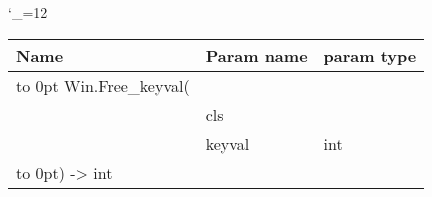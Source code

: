 \begingroup \catcode`\_=12 \tt
\begin{tabular}{lll}
\toprule
\textrm{Name}&\textrm{Param name}&\textrm{param type}\\
\midrule
\hbox to 0pt {Win.Free_keyval(\hss}\\
& cls\\
& keyval & int\\
\hbox to 0pt{) -> int\hss}\\
\bottomrule
\end{tabular}
\endgroup
